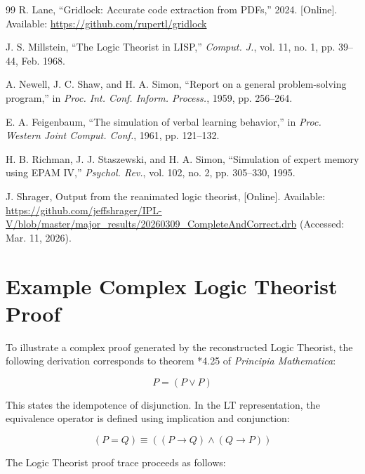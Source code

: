\documentclass[journal]{IEEEtran}
\begin{document}
\begin{thebibliography}{99}
 R. Lane, ``Gridlock: Accurate code
  extraction from PDFs,'' 2024. [Online]. Available:
  \url{https://github.com/rupertl/gridlock}

 J. S. Millstein, ``The Logic Theorist in
  LISP,'' \textit{Comput. J.}, vol. 11, no. 1, pp. 39--44, Feb. 1968.

 A. Newell, J. C. Shaw, and H. A. Simon,
  ``Report on a general problem-solving program,'' in
  \textit{Proc. Int. Conf. Inform. Process.}, 1959, pp. 256--264.

 E. A. Feigenbaum, ``The simulation of
  verbal learning behavior,'' in \textit{Proc. Western Joint
    Comput. Conf.}, 1961, pp. 121--132.

 H. B. Richman, J. J. Staszewski, and
  H. A. Simon, ``Simulation of expert memory using EPAM IV,''
  \textit{Psychol. Rev.}, vol. 102, no. 2, pp. 305--330, 1995.

 J. Shrager, Output from the reanimated logic
  theorist, [Online]. Available:
  \url{https://github.com/jeffshrager/IPL-V/blob/master/major_results/20260309_CompleteAndCorrect.drb}
  (Accessed: Mar. 11, 2026).

\end{thebibliography}

\clearpage %
\onecolumn %

\appendix

\section{Example Complex Logic Theorist Proof}

To illustrate a complex proof generated by the reconstructed Logic
Theorist, the following derivation corresponds to theorem *4.25 of
\textit{Principia Mathematica}:

\[ P = (P \lor P) \]

This states the idempotence of disjunction. In the LT representation,
the equivalence operator is defined using implication and conjunction:

\[ (P = Q) \equiv ((P \rightarrow Q) \land (Q \rightarrow P)) \]

The Logic Theorist proof trace proceeds as follows:
\end{document}
